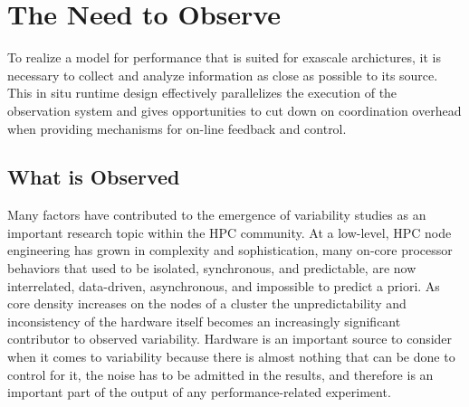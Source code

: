 
\section{The Need to Observe}
To realize a model for performance that is suited for exascale
archictures, it is necessary to collect and analyze information as
close as possible to its source. This in situ runtime design
effectively parallelizes the execution of the observation
system and gives opportunities to cut down on coordination
overhead when providing mechanisms for on-line feedback and control.


\subsection{What is Observed}
Many factors have contributed to the emergence of variability studies
as an important research topic within the HPC community. At a
low-level, HPC node engineering has grown in complexity and
sophistication, many on-core processor behaviors that used to be
isolated, synchronous, and predictable, are now interrelated,
data-driven, asynchronous, and impossible to predict a priori. As core
density increases on the nodes of a cluster the unpredictability and
inconsistency of the hardware itself becomes an increasingly
significant contributor to observed variability. Hardware is an
important source to consider when it comes to variability because
there is almost nothing that can be done to control for it, the noise
has to be admitted in the results, and therefore is an important part
of the output of any performance-related experiment.

